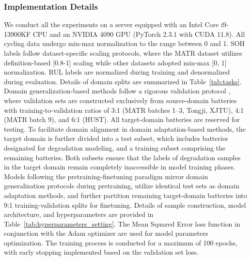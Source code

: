 \documentclass[lettersize,journal]{IEEEtran}
\begin{document}
\subsubsection{Implementation Details}

We conduct all the experiments on a server equipped with an Intel Core i9-13900KF CPU and an NVIDIA 4090 GPU (PyTorch 2.3.1 with CUDA 11.8).
All cycling data undergo min-max normalization to the range between 0 and 1. SOH labels follow dataset-specific scaling protocols, where the MATR dataset utilizes definition-based [0.8-1] scaling while other datasets adopted min-max [0, 1] normalization. RUL labels are normalized during training and denormalized during evaluation.
% 
Details of domain splits are summarized in Table~\ref{tab:tasks}.
% 
Domain generalization-based methods follow a rigorous validation protocol \cite{9847099}, where validation sets are constructed exclusively from source-domain batteries with training-to-validation ratios of 3:1 (MATR batches 1–3, Tongji, XJTU), 4:1 (MATR batch 9), and 6:1 (HUST). All target-domain batteries are reserved for testing. 
% 
To facilitate domain alignment in domain adaptation-based methods, the target domain is further divided into a test subset, which includes batteries designated for degradation modeling, and a training subset comprising the remaining batteries. Both subsets ensure that the labels of degradation samples in the target domain remain completely inaccessible in model training phases.
% 
Models following the pretraining-finetuning paradigm mirror domain generalization protocols during pretraining, utilize identical test sets as domain adaptation methods, and further partition remaining target-domain batteries into 9:1 training-validation splits for finetuning.
% 
Details of sample construction, model architecture, and hyperparameters are provided in Table~\ref{tab:hyperparameters_setting}. The Mean Squared Error loss function in conjunction with the Adam optimizer are used for model parameters optimization. The training process is conducted for a maximum of 100 epochs, with early stopping implemented based on the validation set loss.
\end{document}
